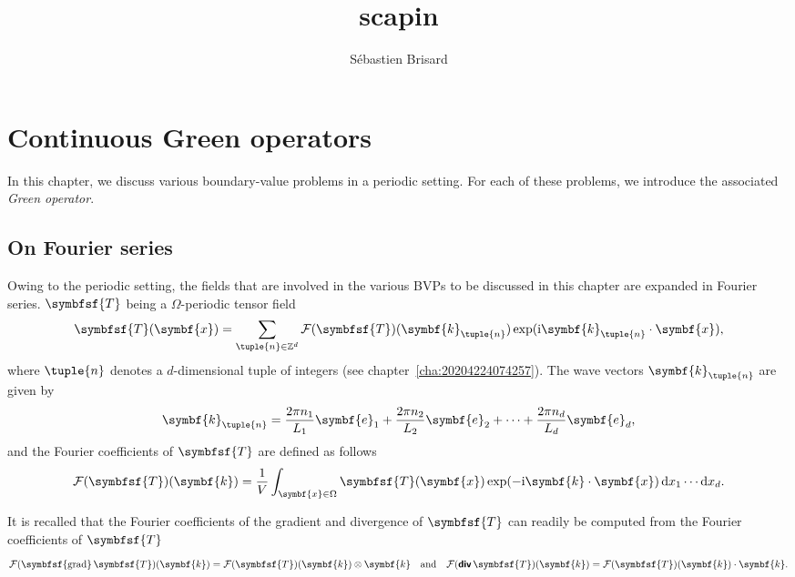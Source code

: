\documentclass[draft, appendixprefix=true, chapterprefix=true, fontsize=12pt, numbers=noendperiod]{scrbook}
\title{scapin}
\author{Sébastien Brisard}
\newcommand{\D}{{\mathrm d}}
\newcommand{\I}{\mathrm{i}}
\newcommand{\integers}{\mathbb{Z}}
\DeclareMathOperator{\tdiv}{\textbf{\textsf{div}}}
\DeclareMathOperator{\tgrad}{\symbfsf{grad}}
\newcommand{\tens}[1]{\symbfsf{#1}}
\renewcommand{\vec}[1]{\symbf{#1}}
\begin{document}
\maketitle

\chapter{Continuous Green operators}
\label{chap:202002060528}

In this chapter, we discuss various boundary-value problems in a periodic
setting. For each of these problems, we introduce the associated \emph{Green
  operator}.

\section{On Fourier series}

Owing to the periodic setting, the fields that are involved in the various BVPs
to be discussed in this chapter are expanded in Fourier series. \(\tens T\)
being a \(\Omega\)-periodic tensor field
\begin{equation}
  \tens T(\vec x)=\sum_{\tuple{n}\in\integers^d}\mathcal F(\tens T)(\vec
  k_{\tuple{n}})\exp(\I\vec k_{\tuple{n}}\cdot\vec x),
\end{equation}
where \(\tuple{n}\) denotes a \(d\)-dimensional tuple of integers (see
chapter~\ref{cha:20204224074257}). The wave vectors \(\vec k_{\tuple{n}}\) are
given by
\begin{equation}
  \label{eq:3}
  \vec k_{\tuple{n}}=\frac{2\pi n_1}{L_1}\vec e_1+\frac{2\pi n_2}{L_2}\vec e_2+
  \cdots+\frac{2\pi n_d}{L_d}\vec e_d,
\end{equation}
and the Fourier coefficients of \(\tens T\) are defined as follows
\begin{equation}
  \label{eq:5}
  \mathcal F(\tens T)(\vec k)=\frac1V\int_{\vec x\in\Omega}\tens T(\vec x)
  \exp(-\I\vec k\cdot\vec x)\,\D x_1\cdots\D x_d.
\end{equation}

It is recalled that the Fourier coefficients of the gradient and divergence of
\(\tens T\) can readily be computed from the Fourier coefficients of
\(\tens T\)
\begin{equation}
  \label{eq:4}
  \mathcal F(\tgrad\tens T)(\vec k)=\mathcal F(\tens T)(\vec k)\otimes\vec k
  \quad\text{and}\quad
  \mathcal F(\tdiv\tens T)(\vec k)=\mathcal F(\tens T)(\vec k)\cdot\vec k.
\end{equation}
\end{document}
